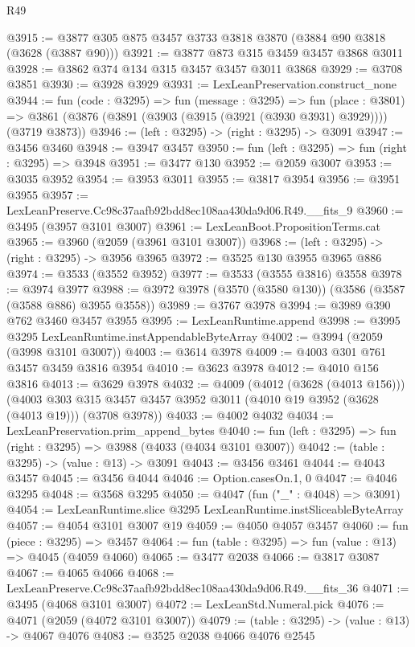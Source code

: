 \begin{lexlean}{R49}
\begin{coremodule}
@3915 := @3877 @305 @875 @3457 @3733 @3818 @3870 (@3884 @90 @3818 (@3628 (@3887 @90)))
@3921 := @3877 @873 @315 @3459 @3457 @3868 @3011
@3928 := @3862 @374 @134 @315 @3457 @3457 @3011 @3868
@3929 := @3708 @3851
@3930 := @3928 @3929
@3931 := LexLeanPreservation.construct_none
@3944 := fun (code : @3295) =>
  fun (message : @3295) =>
  fun (place : @3801) =>
  @3861 (@3876 (@3891 (@3903 (@3915 (@3921 (@3930 @3931) @3929)))) (@3719 @3873))
@3946 := (left : @3295) -> (right : @3295) -> @3091
@3947 := @3456 @3460
@3948 := @3947 @3457
@3950 := fun (left : @3295) => fun (right : @3295) => @3948
@3951 := @3477 @130
@3952 := @2059 @3007
@3953 := @3035 @3952
@3954 := @3953 @3011
@3955 := @3817 @3954
@3956 := @3951 @3955
@3957 := LexLeanPreserve.Cc98c37aafb92bdd8ec108aa430da9d06.R49.__fits_9
@3960 := @3495 (@3957 @3101 @3007)
@3961 := LexLeanBoot.PropositionTerms.cat
@3965 := @3960 (@2059 (@3961 @3101 @3007))
@3968 := (left : @3295) -> (right : @3295) -> @3956 @3965
@3972 := @3525 @130 @3955 @3965 @886
@3974 := @3533 (@3552 @3952)
@3977 := @3533 (@3555 @3816) @3558
@3978 := @3974 @3977
@3988 := @3972 @3978 (@3570 (@3580 @130)) (@3586 (@3587 (@3588 @886) @3955 @3558))
@3989 := @3767 @3978
@3994 := @3989 @390 @762 @3460 @3457 @3955
@3995 := LexLeanRuntime.append
@3998 := @3995 @3295 LexLeanRuntime.instAppendableByteArray
@4002 := @3994 (@2059 (@3998 @3101 @3007))
@4003 := @3614 @3978
@4009 := @4003 @301 @761 @3457 @3459 @3816 @3954
@4010 := @3623 @3978
@4012 := @4010 @156 @3816
@4013 := @3629 @3978
@4032 := @4009
    (@4012 (@3628 (@4013 @156)))
    (@4003 @303 @315 @3457 @3457 @3952 @3011 (@4010 @19 @3952 (@3628 (@4013 @19))) (@3708 @3978))
@4033 := @4002 @4032
@4034 := LexLeanPreservation.prim_append_bytes
@4040 := fun (left : @3295) => fun (right : @3295) => @3988 (@4033 (@4034 @3101 @3007))
@4042 := (table : @3295) -> (value : @13) -> @3091
@4043 := @3456 @3461
@4044 := @4043 @3457
@4045 := @3456 @4044
@4046 := Option.casesOn.{1, 0}
@4047 := @4046 @3295
@4048 := @3568 @3295
@4050 := @4047 (fun ("_" : @4048) => @3091)
@4054 := LexLeanRuntime.slice @3295 LexLeanRuntime.instSliceableByteArray
@4057 := @4054 @3101 @3007 @19
@4059 := @4050 @4057 @3457
@4060 := fun (piece : @3295) => @3457
@4064 := fun (table : @3295) => fun (value : @13) => @4045 (@4059 @4060)
@4065 := @3477 @2038
@4066 := @3817 @3087
@4067 := @4065 @4066
@4068 := LexLeanPreserve.Cc98c37aafb92bdd8ec108aa430da9d06.R49.__fits_36
@4071 := @3495 (@4068 @3101 @3007)
@4072 := LexLeanStd.Numeral.pick
@4076 := @4071 (@2059 (@4072 @3101 @3007))
@4079 := (table : @3295) -> (value : @13) -> @4067 @4076
@4083 := @3525 @2038 @4066 @4076 @2545

\end{coremodule}
\end{lexlean}
